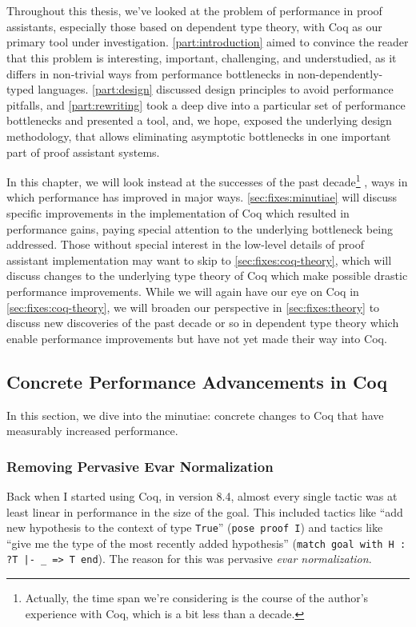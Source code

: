 \chapter{}\label{ch:coq-tooling-fixes}\label{ch:retrospective}
Throughout this thesis, we've looked at the problem of performance in proof assistants, especially those based on dependent type theory, with Coq as our primary tool under investigation.
\autoref{part:introduction} aimed to convince the reader that this problem is interesting, important, challenging, and understudied, as it differs in non-trivial ways from performance bottlenecks in non-dependently-typed languages.
\autoref{part:design} discussed design principles to avoid performance pitfalls, and \autoref{part:rewriting} took a deep dive into a particular set of performance bottlenecks and presented a tool, and, we hope, exposed the underlying design methodology, that allows eliminating asymptotic bottlenecks in one important part of proof assistant systems.

In this chapter, we will look instead at the successes of the past decade\footnote{%
  Actually, the time span we're considering is the course of the author's experience with Coq, which is a bit less than a decade.%
}%
, ways in which performance has improved in major ways.
\autoref{sec:fixes:minutiae} will discuss specific improvements in the implementation of Coq which resulted in performance gains, paying special attention to the underlying bottleneck being addressed.
Those without special interest in the low-level details of proof assistant implementation may want to skip to \autoref{sec:fixes:coq-theory}, which will discuss changes to the underlying type theory of Coq which make possible drastic performance improvements.
While we will again have our eye on Coq in \autoref{sec:fixes:coq-theory}, we will broaden our perspective in \autoref{sec:fixes:theory} to discuss new discoveries of the past decade or so in dependent type theory which enable performance improvements but have not yet made their way into Coq.

\section{Concrete Performance Advancements in Coq}\label{sec:fixes:minutiae}
In this section, we dive into the minutiae: concrete changes to Coq that have measurably increased performance.
\subsection{Removing Pervasive Evar Normalization}\label{sec:econstr}
Back when I started using Coq, in version 8.4, almost every single tactic was at least linear in performance in the size of the goal.
This included tactics like ``add new hypothesis to the context of type \texttt{True}'' (\texttt{pose proof I}) and tactics like ``give me the type of the most recently added hypothesis'' (\texttt{match goal with H : ?T |- _ => T end}).
The reason for this was pervasive \emph{evar normalization}.

